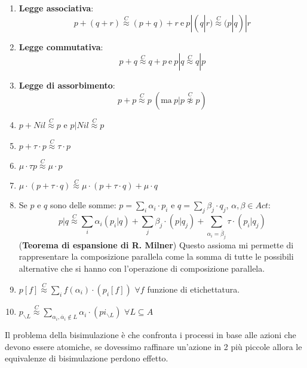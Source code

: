 \begin{enumerate}
    \item \textbf{Legge associativa}:
          \begin{equation}
              p + (q + r) \stackrel{C}{\approx} (p + q) + r \ \text{e} \ p | (q | r)
              \stackrel{C}{\approx} (p | q) | r
          \end{equation}
    \item \textbf{Legge commutativa}:
          \begin{equation}
              p + q \stackrel{C}{\approx} q + p \ \text{e} \ p | q
              \stackrel{C}{\approx} q | p
          \end{equation}
    \item \textbf{Legge di assorbimento}:
          \begin{equation}
              p + p \stackrel{C}{\approx} p \ (\text{ma} \ p | p
              \stackrel{C}{\not\approx} p)
          \end{equation}
    \item $p + Nil \stackrel{C}{\approx} p$ e $p | Nil \stackrel{C}{\approx} p$
    \item $p + \tau \cdot p \stackrel{C}{\approx} \tau \cdot p$
    \item $\mu \cdot \tau p \stackrel{C}{\approx} \mu \cdot p$
    \item $\mu \cdot (p + \tau \cdot q) \stackrel{C}{\approx} \mu \cdot (p +
              \tau \cdot q) + \mu \cdot q$
    \item Se $p$ e $q$ sono delle somme: $p = \sum_{i} \alpha_i \cdot p_i$ e
          $q = \sum_{j} \beta_j \cdot q_j$,  $\alpha, \beta \in Act$:
          $$p | q \stackrel{C}{\approx} \sum_{i} \alpha_i (p_{i} | q) + \sum_{j}
              \beta_{j} \cdot (p|q_{j}) + \sum_{\alpha_i = \overline{\beta}_{j}}
              \tau \cdot (p_{i} | q_{j})$$
          (\textbf{Teorema di espansione di R. Milner}) Questo assioma mi permette
          di rappresentare la composizione parallela come la somma di tutte le
          possibili alternative che si hanno con l'operazione di composizione
          parallela.
    \item $p[f] \stackrel{C}{\approx} \sum_{i} f(\alpha_i) \cdot (p_{i} [f])$ $\forall f$
          funzione di etichettatura.
    \item $p_{\backslash L} \stackrel{C}{\approx} \sum_{\alpha_i,\overline{\alpha}_i
                  \not\in L} \alpha_i \cdot (pi_{\backslash L})$ $\forall L \subseteq A$
\end{enumerate}
Il problema della bisimulazione è che confronta i processi in base alle azioni che
devono essere atomiche, se dovessimo raffinare un'azione in 2 più piccole allora
le equivalenze di bisimulazione perdono effetto.

